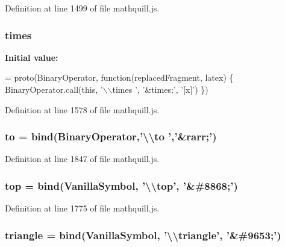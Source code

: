 Definition at line 1499 of file mathquill.\-js.

\subsubsection[{times}]{ times}\label{mathquill_8js_ac4c21f2eb0c639171987ac220205a889}
{\bfseries Initial value\-:}
\begin{DoxyCode}
= proto(BinaryOperator, \textcolor{keyword}{function}(replacedFragment, latex) \{
  BinaryOperator.call(\textcolor{keyword}{this}, \textcolor{stringliteral}{'\(\backslash\)\(\backslash\)times '}, \textcolor{stringliteral}{'&times;'}, \textcolor{stringliteral}{'[x]'})
\})
\end{DoxyCode}


Definition at line 1578 of file mathquill.\-js.

\subsubsection[{to}]{ to = {\bf bind}({\bf Binary\-Operator},'\textbackslash{}\textbackslash{}to ','\&{\bf rarr};')}\label{mathquill_8js_ae3622f38202b3532cd6eae25726945f8}


Definition at line 1847 of file mathquill.\-js.

\subsubsection[{top}]{ top = {\bf bind}({\bf Vanilla\-Symbol}, '\textbackslash{}\textbackslash{}top', '\&\#8868;')}\label{mathquill_8js_aea2d0b0866e83365ac82883929404242}


Definition at line 1775 of file mathquill.\-js.

\subsubsection[{triangle}]{ triangle = {\bf bind}({\bf Vanilla\-Symbol}, '\textbackslash{}\textbackslash{}triangle', '\&\#9653;')}\label{mathquill_8js_a17593c988bd26fb246e24663b07581fc}



